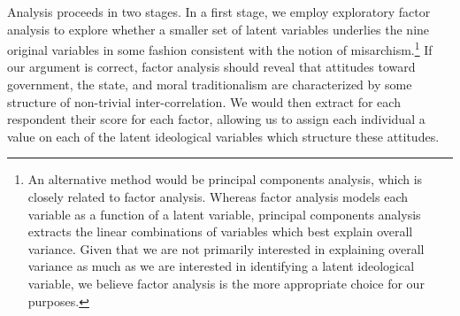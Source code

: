\documentclass[12pt,]{article}
\begin{document}
Analysis proceeds in two stages. In a first stage, we employ exploratory
factor analysis to explore whether a smaller set of latent variables
underlies the nine original variables in some fashion consistent with
the notion of
misarchism.\footnote{An alternative method would be principal components analysis, which is closely related to factor analysis. Whereas factor analysis models each variable as a function of a latent variable, principal components analysis extracts the linear combinations of variables which best explain overall variance. Given that we are not primarily interested in explaining overall variance as much as we are interested in identifying a latent ideological variable, we believe factor analysis is the more appropriate choice for our purposes.}
If our argument is correct, factor analysis should reveal that attitudes
toward government, the state, and moral traditionalism are characterized
by some structure of non-trivial inter-correlation. We would then
extract for each respondent their score for each factor, allowing us to
assign each individual a value on each of the latent ideological
variables which structure these attitudes.
\end{document}
